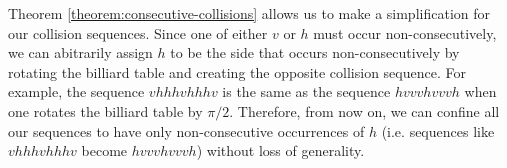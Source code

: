 Theorem \ref{theorem:consecutive-collisions} allows us to make a simplification for our collision sequences. Since one of either $v$ or $h$ must occur non-consecutively, we can abitrarily assign $h$ to be the side that occurs non-consecutively by rotating the billiard table and creating the opposite collision sequence. For example, the sequence $vhhhvhhhv$ is the same as the sequence $hvvvhvvvh$ when one rotates the billiard table by $\pi/2$. Therefore, from now on, we can confine all our sequences to have only non-consecutive occurrences of $h$ (i.e. sequences like $vhhhvhhhv$ become $hvvvhvvvh$) without loss of generality.
